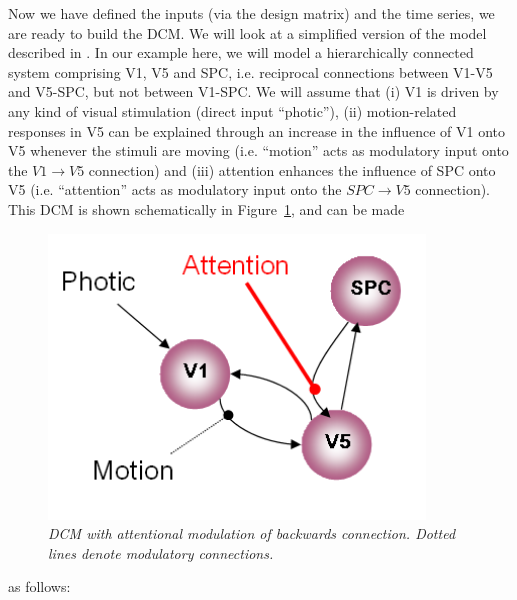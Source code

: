 Now we have defined the inputs (via the design matrix) and the time series, we are ready to build the DCM. We will look at a simplified version of the model described in \cite{dcm}.  In our example here, we will model a hierarchically connected system comprising V1, V5 and SPC, i.e. reciprocal connections between V1-V5 and V5-SPC, but not between V1-SPC. We will assume that (i) V1 is driven by any kind of visual stimulation (direct input ``photic''), (ii) motion-related responses in V5 can be explained through an increase in the influence of V1 onto V5 whenever the stimuli are moving (i.e. ``motion'' acts as modulatory input onto the $V1 \rightarrow V5$ connection) and (iii) attention enhances the influence of SPC onto V5 (i.e. ``attention'' acts as modulatory input onto the $SPC \rightarrow V5$ connection). This DCM is shown schematically in Figure~\ref{bwd}, and can be made
\begin{figure}[ht]
\begin{center}
\includegraphics[width=100mm]{dcm/dcm_mod_bwd}
\caption{\em DCM with attentional modulation of backwards connection. Dotted lines denote modulatory connections.\label{bwd}}
\end{center}
\end{figure}
as follows:

